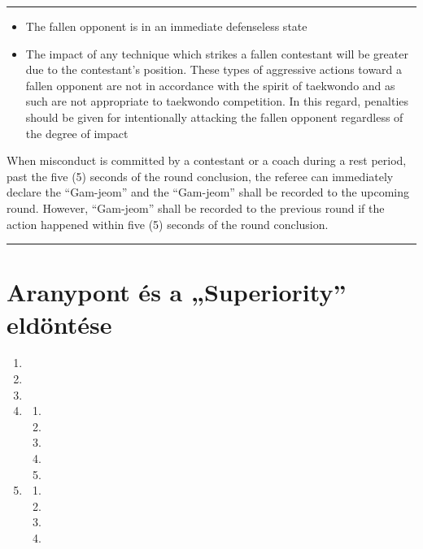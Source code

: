 \documentclass[]{report}
\newenvironment{expl}[0]%
  {\rule{\textwidth}{.2pt}\footnotesize}%
  {\rule{\textwidth}{.2pt}\normalsize}
\begin{document}
\begin{expl}
\begin{enumerate}
  \begin{itemize}
  \item
    The fallen opponent is in an immediate defenseless state
  \item
    The impact of any technique which strikes a fallen contestant will
    be greater due to the contestant's position. These types of
    aggressive actions toward a fallen opponent are not in accordance
    with the spirit of taekwondo and as such are not appropriate to
    taekwondo competition. In this regard, penalties should be given for
    intentionally attacking the fallen opponent regardless of the degree
    of impact
  \end{itemize}
\end{enumerate}

When misconduct is committed by a contestant or a coach during a rest
period, past the five (5) seconds of the round conclusion, the referee
can immediately declare the ``Gam-jeom'' and the ``Gam-jeom'' shall be
recorded to the upcoming round. However, ``Gam-jeom'' shall be recorded
to the previous round if the action happened within five (5) seconds of
the round conclusion.

\end{expl}


\chapter{Aranypont és a „Superiority” eldöntése}

\begin{enumerate}
\item

\item

\item

\item

    \begin{enumerate}
    \item
    
    \item
    
    \item
    
    \item
    
    \item
    
    \end{enumerate}
\item

    \begin{enumerate}
    \item
    
    \item
    
    \item
    
    \item
    
    \end{enumerate}
\end{enumerate}
\end{document}
